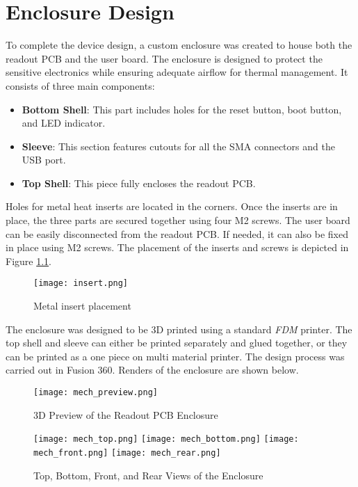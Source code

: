 \chapter{Enclosure Design}
To complete the device design, a custom enclosure was created to house both the readout PCB and the user board. The enclosure is designed to protect the sensitive electronics while ensuring adequate airflow for thermal management. It consists of three main components: 

\begin{itemize}
    \item \textbf{Bottom Shell}: This part includes holes for the reset button, boot button, and LED indicator.
    \item \textbf{Sleeve}: This section features cutouts for all the SMA connectors and the USB port.
    \item \textbf{Top Shell}: This piece fully encloses the readout PCB.
\end{itemize}

Holes for metal heat inserts are located in the corners. Once the inserts are in place, the three parts are secured together using four M2 screws. The user board can be easily disconnected from the readout PCB. If needed, it can also be fixed in place using M2 screws. The placement of the inserts and screws is depicted in Figure \ref{fig:readout_inserts}.

\FloatBarrier
\begin{figure}[htp!]
    \centering
    \texttt{[image: insert.png]}
    \caption{Metal insert placement}
    \label{fig:readout_inserts}
\end{figure}
\FloatBarrier

The enclosure was designed to be 3D printed using a standard \emph{FDM} printer. The top shell and sleeve can either be printed separately and glued together, or they can be printed as a one piece on multi material printer. The design process was carried out in Fusion 360. Renders of the enclosure are shown below.

\FloatBarrier
\begin{figure}[htp!]
    \centering
    \texttt{[image: mech\_preview.png]}
    \caption{3D Preview of the Readout PCB Enclosure}
    \label{fig:readout_3d_preview}
\end{figure}
\FloatBarrier

\FloatBarrier
\begin{figure}[htp!]
    \centering
    \texttt{[image: mech\_top.png]}
    \texttt{[image: mech\_bottom.png]}
    \texttt{[image: mech\_front.png]}
    \texttt{[image: mech\_rear.png]}
    \caption{Top, Bottom, Front, and Rear Views of the Enclosure}
    \label{fig:readout_3d_views}
\end{figure}
\FloatBarrier
